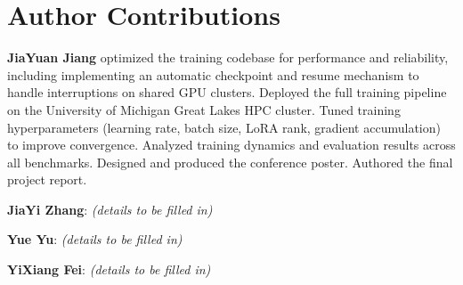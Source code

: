 \documentclass[11pt,letterpaper]{article}
\begin{document}
\section*{Author Contributions}

\textbf{JiaYuan Jiang} optimized the training codebase for performance
and reliability, including implementing an automatic checkpoint and
resume mechanism to handle interruptions on shared GPU clusters.
Deployed the full training pipeline on the University of Michigan
Great Lakes HPC cluster.
Tuned training hyperparameters (learning rate, batch size, LoRA rank,
gradient accumulation) to improve convergence.
Analyzed training dynamics and evaluation results across all benchmarks.
Designed and produced the conference poster.
Authored the final project report.

\textbf{JiaYi Zhang}: \textit{(details to be filled in)}

\textbf{Yue Yu}: \textit{(details to be filled in)}

\textbf{YiXiang Fei}: \textit{(details to be filled in)}



\end{document}
